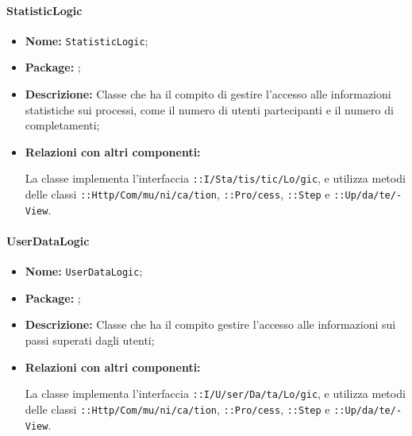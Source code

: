 \paragraph{StatisticLogic}
\begin{flushleft}
\begin{itemize}
\item \textbf{Nome:} \texttt{StatisticLogic};
\item \textbf{Package:} \texttt{\logicAdmin{}};
\item \textbf{Descrizione:} Classe che ha il compito di gestire l'accesso alle informazioni statistiche sui processi, come il numero di utenti partecipanti e il numero di completamenti;
\item \textbf{Relazioni con altri componenti:}
\begin{sloppypar}
La classe implementa l'interfaccia \texttt{\iLogicAdmin{}::I\fshyp{}Sta\fshyp{}tis\fshyp{}tic\fshyp{}Lo\fshyp{}gic}, e utilizza metodi delle classi \texttt{\serverCommunication{}::Http\fshyp{}Com\fshyp{}mu\fshyp{}ni\fshyp{}ca\fshyp{}tion}, \texttt{\modelAdmin{}::Pro\fshyp{}cess}, \texttt{\model{}::Step} e \texttt{\logicAdmin{}::Up\fshyp{}da\fshyp{}te\fshyp{}View}.
\end{sloppypar}
\end{itemize}
\end{flushleft}

\paragraph{UserDataLogic}
\begin{flushleft}
\begin{itemize}
\item \textbf{Nome:} \texttt{UserDataLogic};
\item \textbf{Package:} \texttt{\logicAdmin{}};
\item \textbf{Descrizione:} Classe che ha il compito gestire l'accesso alle informazioni sui passi superati dagli utenti;
\item \textbf{Relazioni con altri componenti:}
\begin{sloppypar}
La classe implementa l'interfaccia \texttt{\iLogicAdmin{}::I\fshyp{}U\fshyp{}ser\fshyp{}Da\fshyp{}ta\fshyp{}Lo\fshyp{}gic}, e utilizza metodi delle classi \texttt{\serverCommunication{}::Http\fshyp{}Com\fshyp{}mu\fshyp{}ni\fshyp{}ca\fshyp{}tion}, \texttt{\modelAdmin{}::Pro\fshyp{}cess}, \texttt{\model{}::Step} e \texttt{\logicAdmin{}::Up\fshyp{}da\fshyp{}te\fshyp{}View}.
\end{sloppypar}
\end{itemize}
\end{flushleft}

